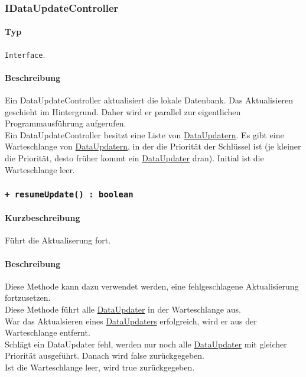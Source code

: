 \subsubsection{IDataUpdateController}\label{App_DocumentViewer_IDataupdateController}
\paragraph*{Typ}
\texttt{Interface}.
\paragraph*{Beschreibung}
Ein DataUpdateController aktualisiert die lokale Datenbank. Das Aktualisieren geschieht im 
Hintergrund. Daher wird er parallel zur eigentlichen Programmausführung aufgerufen.\\
Ein DataUpdateController besitzt eine Liste von \hyperref[App_DocumentViewer_DataUpdater]{DataUpdatern}.
Es gibt eine Warteschlange von \hyperref[App_DocumentViewer_DataUpdater]{DataUpdatern}, in der die Priorität der Schlüssel ist (je kleiner 
die Priorität, desto früher kommt ein \hyperref[App_DocumentViewer_DataUpdater]{DataUpdater} dran). Initial ist die Warteschlange leer.\\


\subsubsection*{\texttt{+ resumeUpdate() : boolean}}\label{App_DocumentViewer_IDataupdateController_resumeUpdate}%
\paragraph*{Kurzbeschreibung}
Führt die Aktualiserung fort.
\paragraph*{Beschreibung}
Diese Methode kann dazu verwendet werden, eine fehlgeschlagene Aktualisierung fortzusetzen.\\
Diese Methode führt alle \hyperref[App_DocumentViewer_DataUpdater]{DataUpdater} in der Warteschlange aus.\\
War das Aktualsieren eines \hyperref[App_DocumentViewer_DataUpdater]{DataUpdaters} erfolgreich, wird er aus der Warteschlange entfernt.\\
Schlägt ein DataUpdater fehl, werden nur noch alle \hyperref[App_DocumentViewer_DataUpdater]{DataUpdater} mit gleicher Priorität 
ausgeführt. Danach wird false zurückgegeben.\\
Ist die Warteschlange leer, wird true zurückgegeben.\\
